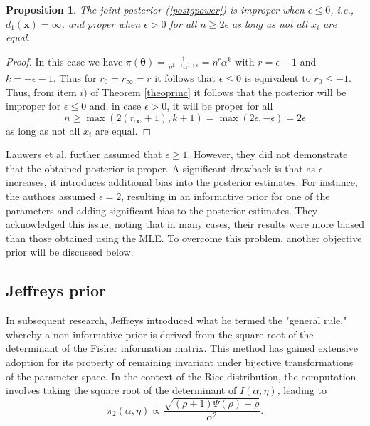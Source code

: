 \documentclass[12pt]{interact}
\theoremstyle{plain}%
\newtheorem{proposition}[theorem]{Proposition}
\theoremstyle{definition}
\theoremstyle{remark}
\begin{document}
\begin{proposition}\label{prop1} The joint posterior (\ref{postgpower}) is improper when $\epsilon\leq 0$, i.e., $d_1(\boldsymbol{x})=\infty$, and proper when $\epsilon>0$ for all $n\geq 2\epsilon$ as long as not all $x_i$ are equal.
\end{proposition}
\begin{proof} In this case we have $\pi(\boldsymbol{\theta})=\frac{1}{\eta^{1-\epsilon}\alpha^{1+\epsilon}}=\eta^{r}\alpha^{k}$ with $r=\epsilon-1$ and $k=-\epsilon-1$. Thus for $r_0=r_\infty=r$ it follows that $\epsilon\leq 0$ is equivalent to $r_0\leq -1$. Thus, from item $i)$ of Theorem \ref{theoprinc} it follows that the posterior will be improper for $\epsilon\leq 0$ and, in case $\epsilon>0$, it will be proper for all
\begin{equation*}n\geq \max(2(r_\infty+1),k+1)=\max(2\epsilon,-\epsilon)=2\epsilon
\end{equation*}
as long as not all $x_i$ are equal.
\end{proof}

Lauwers et al. \cite{lauwers2009estimating} further assumed that $\epsilon \geq 1$. However, they did not demonstrate that the obtained posterior is proper. A significant drawback is that as $\epsilon$ increases, it introduces additional bias into the posterior estimates. For instance, the authors assumed $\epsilon = 2$, resulting in an informative prior for one of the parameters and adding significant bias to the posterior estimates. They acknowledged this issue, noting that in many cases, their results were more biased than those obtained using the MLE.  To overcome this problem, another objective prior will be discussed below.

\subsection{Jeffreys prior}

In subsequent research, Jeffreys \cite{jeffreys1946invariant} introduced what he termed the "general rule," whereby a non-informative prior is derived from the square root of the determinant of the Fisher information matrix. This method has gained extensive adoption for its property of remaining invariant under bijective transformations of the parameter space. In the context of the Rice distribution, the computation involves taking the square root of the determinant of $I(\alpha,\eta)$, leading to
\begin{equation}\label{priorjnk}
\pi_2\left(\alpha,\eta\right)\propto \frac{\sqrt{(\rho+1)\Psi(\rho)-\rho}}{\alpha^2}.
\end{equation}
\end{document}
